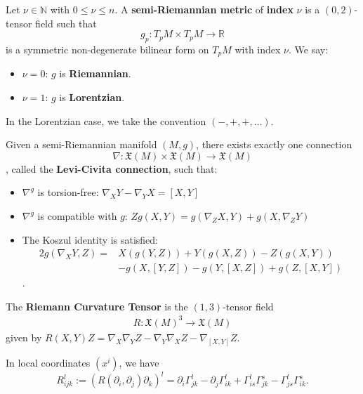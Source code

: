 \begin{definition}
   Let $\nu \in \mathbb{N}$ with $0 \leq \nu \leq n$. A \textbf{semi-Riemannian metric} of \textbf{index} $\nu$ is a $(0,2)$-tensor field such that \[
   g_p: T_pM \times T_pM \to \mathbb{R}
   \] is a symmetric non-degenerate bilinear form on $T_pM$ with index $\nu$. We say:
   \begin{itemize}
       \item $\nu = 0$: $g$ is \textbf{Riemannian}.
        \item $\nu =1$: $g$ is \textbf{Lorentzian}.
   \end{itemize}
\end{definition}
In the Lorentzian case, we take the convention $(-,+,+,\dots)$.
\begin{theorem}
   Given a semi-Riemannian manifold $(M,g)$, there exists exactly one connection \[
   \nabla: \mathfrak{X}(M) \times \mathfrak{X}(M) \to \mathfrak{X}(M)
   \] , called the \textbf{Levi-Civita connection}, such that:
   \begin{itemize}
       \item $\nabla^g$ is torsion-free: $\nabla_X Y - \nabla_Y X = [X,Y]$
       \item $\nabla^g$ is compatible with $g$: $Zg(X,Y)= g(\nabla_Z X, Y) + g(X, \nabla_Z Y)$
        \item The Koszul identity is satisfied:
            \begin{align*}
                2g(\nabla_XY,Z) = &X(g(Y,Z))+Y(g(X,Z)) - Z(g(X,Y)) \\
                                  &-g (X, [Y,Z])-g(Y,[X,Z])+g(Z,[X,Y])
            \end{align*}.
   \end{itemize}
\end{theorem}
\begin{definition}
    The \textbf{Riemann Curvature Tensor} is the $(1,3)$-tensor field 
    \begin{align*}
    R: \mathfrak{X}(M)^3 \to \mathfrak{X}(M)
    \end{align*}
    given by $R(X,Y)Z=\nabla_X \nabla_Y Z - \nabla_Y \nabla_X Z - \nabla_{[X,Y]}Z$.
\end{definition}
\begin{remark}
    In local coordinates $(x^i)$, we have \[
        R_{ijk}^l := (R(\partial_i,\partial_j)\partial_k)^l = \partial_i \Gamma_{jk}^l-\partial_j \Gamma_{ik}^l + \Gamma_{is}^l \Gamma_{jk}^s - \Gamma_{js}^l\Gamma_{ik}^s
    .\] 
\end{remark}
